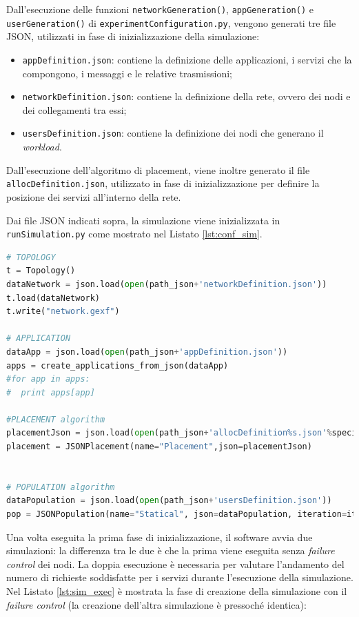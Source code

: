 Dall'esecuzione delle funzioni \texttt{networkGeneration()}, \texttt{appGeneration()} e \texttt{userGeneration()} di \texttt{experimentConfiguration.py}, vengono generati tre file JSON, utilizzati in fase di inizializzazione della simulazione:
\begin{itemize}
	\item \texttt{appDefinition.json}: contiene la definizione delle applicazioni, i servizi che la compongono, i messaggi e le relative trasmissioni;
	\item \texttt{networkDefinition.json}: contiene la definizione della rete, ovvero dei nodi e dei collegamenti tra essi;
	\item \texttt{usersDefinition.json}: contiene la definizione dei nodi che generano il \textit{workload}.
\end{itemize}

Dall'esecuzione dell'algoritmo di placement, viene inoltre generato il file \texttt{allocDefinition.json}, utilizzato in fase di inizializzazione per definire la posizione dei servizi all'interno della rete. 

Dai file JSON indicati sopra, la simulazione viene inizializzata in \texttt{runSimulation.py} come mostrato nel Listato \ref{lst:conf_sim}.

\begin{lstlisting}[language=python, captionpos=b, caption={Configurazione della simulazione da file JSON.}, label={lst:conf_sim}]
# TOPOLOGY
t = Topology()
dataNetwork = json.load(open(path_json+'networkDefinition.json'))
t.load(dataNetwork)
t.write("network.gexf")
    
# APPLICATION
dataApp = json.load(open(path_json+'appDefinition.json'))
apps = create_applications_from_json(dataApp)
#for app in apps:
#  print apps[app]

#PLACEMENT algorithm
placementJson = json.load(open(path_json+'allocDefinition%s.json'%specificSuffix))
placement = JSONPlacement(name="Placement",json=placementJson)


# POPULATION algorithm
dataPopulation = json.load(open(path_json+'usersDefinition.json'))
pop = JSONPopulation(name="Statical", json=dataPopulation, iteration=it)
\end{lstlisting}

Una volta eseguita la prima fase di inizializzazione, il software avvia due simulazioni: la differenza tra le due è che la prima viene eseguita senza \textit{failure control} dei nodi. La doppia esecuzione è necessaria per valutare l'andamento del numero di richieste soddisfatte per i servizi durante l'esecuzione della simulazione. Nel Listato \ref{lst:sim_exec} è mostrata la fase di creazione della simulazione con il \textit{failure control} (la creazione dell'altra simulazione è pressoché identica):


